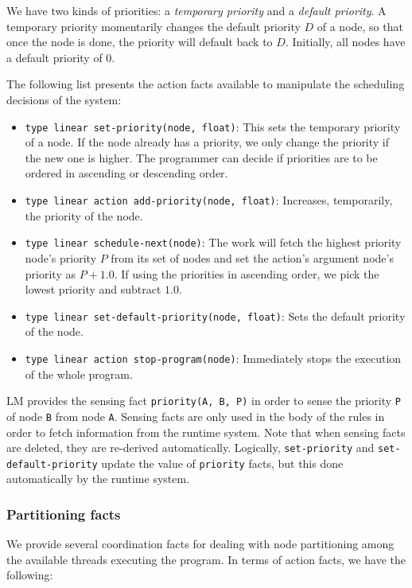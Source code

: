 We have two kinds of priorities: a \emph{temporary priority} and a \emph{default
priority}. A temporary priority momentarily changes the default priority $D$ of a
node, so that once the node is done, the priority will default back to $D$.
Initially, all nodes have a default priority of $0$.

The following list presents the action facts available to manipulate the scheduling
decisions of the system:

\begin{itemize}
   \item \texttt{type linear set-priority(node, float)}: This sets the
   temporary priority of a node. If the node already has a priority, we only
   change the priority if the new one is higher. The programmer can
   decide if priorities are to be ordered in ascending or descending order.
   \item \texttt{type linear action add-priority(node, float)}: Increases,
   temporarily, the priority of the node.
   \item\texttt{type linear schedule-next(node)}: The work will fetch the
   highest priority node's priority $P$ from its set of nodes and set the
   action's argument node's priority as $P + 1.0$. If using the priorities in
   ascending order, we pick the lowest priority and subtract $1.0$.
   \item\texttt{type linear set-default-priority(node, float)}: Sets the default
   priority of the node.
   \item \texttt{type linear action stop-program(node)}: Immediately stops the
   execution of the whole program.
\end{itemize}

LM provides the sensing fact \texttt{priority(A, B, P)} in order to sense the
priority \texttt{P} of node \texttt{B} from node \texttt{A}.
Sensing facts are only used in the body of the rules in order
to fetch information from the runtime system.
Note that when sensing facts are deleted, they are re-derived automatically.
Logically, \texttt{set-priority} and \texttt{set-default-priority} update the
value of \texttt{priority} facts, but this done automatically by the runtime
system.

\subsubsection{Partitioning facts}

We provide several coordination facts for dealing with node partitioning among
the available threads executing the program. In terms of action
facts, we have the following:

